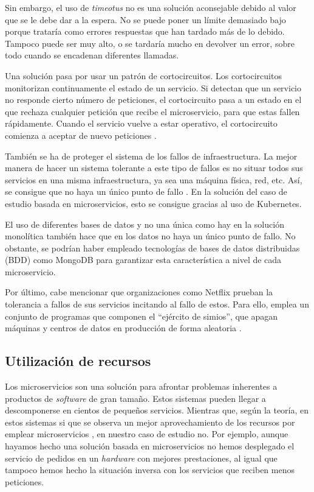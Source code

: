 \documentclass[11pt,spanish,listoffigures]{tfgetsinf}
\begin{document}
Sin embargo, el uso de \textit{timeotus} no es una solución aconsejable debido al valor que se le debe dar a la espera. No se puede poner un límite demasiado bajo porque trataría como errores respuestas que han tardado más de lo debido. Tampoco puede ser muy alto, o se tardaría mucho en devolver un error, sobre todo cuando se encadenan diferentes llamadas.

Una solución pasa por usar un patrón de cortocircuitos. Los cortocircuitos monitorizan continuamente el estado de un servicio. Si detectan que un servicio no responde cierto número de peticiones, el cortocircuito pasa a un estado en el que rechaza cualquier petición que recibe el microservicio, para que estas fallen rápidamente. Cuando el servicio vuelve a estar operativo, el cortocircuito comienza a aceptar de nuevo peticiones \cite{Richards2016}.

También se ha de proteger el sistema de los fallos de infraestructura. La mejor manera de hacer un sistema tolerante a este tipo de fallos es no situar todos sus servicios en una misma infraestructura, ya sea una máquina física, red, etc. Así, se consigue que no haya un único punto de fallo \cite{Newman2015a}. En la solución del caso de estudio basada en microservicios, esto se consigue gracias al uso de Kubernetes.

El uso de diferentes bases de datos y no una única como hay en la solución monolítica también hace que en los datos no haya un único punto de fallo. No obstante, se podrían haber empleado tecnologías de bases de datos distribuidas (BDD) como MongoDB para garantizar esta característica a nivel de cada microservicio.

Por último, cabe mencionar que organizaciones como Netflix prueban la tolerancia a fallos de sus servicios incitando al fallo de estos. Para ello, emplea un conjunto de programas que componen el ``ejército de simios'', que apagan máquinas y centros de datos en producción de forma aleatoria \cite{Lewis2014}.

\subsection{Utilización de recursos}

Los microservicios son una solución para afrontar problemas inherentes a productos de \textit{software} de gran tamaño. Estos sistemas pueden llegar a descomponerse en cientos de pequeños servicios. Mientras que, según la teoría, en estos sistemas si que se observa un mejor aprovechamiento de los recursos por emplear microservicios \cite{DelaTorre2018}, en nuestro caso de estudio no. Por ejemplo, aunque hayamos hecho una solución basada en microservicios no hemos desplegado el servicio de pedidos en un \textit{hardware} con mejores prestaciones, al igual que tampoco hemos hecho la situación inversa con los servicios que reciben menos peticiones.
\end{document}
